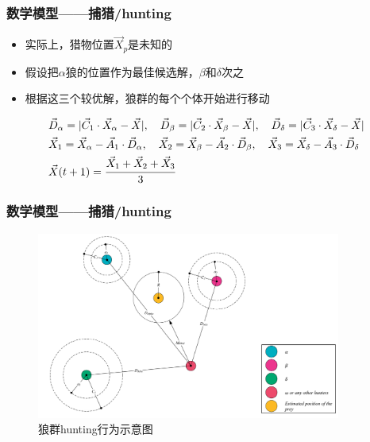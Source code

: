 \begin{frame}
	\frametitle{数学模型——捕猎/hunting}
	\begin{itemize}
		\item {实际上，猎物位置$\vec{X}_p$是未知的}
		\item {假设把$\alpha$狼的位置作为最佳候选解，$\beta$和$\delta$次之}
		\item {根据这三个较优解，狼群的每个个体开始进行移动}
	\end{itemize}
	\begin{align}
	&\vec{D}_{\alpha}=|\vec{C}_1 \cdot \vec{X}_{\alpha}-\vec{X}|,\quad \vec{D}_{\beta}=|\vec{C}_2 \cdot \vec{X}_{\beta}-\vec{X}|,\quad \vec{D}_{\delta}=|\vec{C}_3 \cdot \vec{X}_{\delta}-\vec{X}| \\
	&\vec{X}_1=\vec{X}_{\alpha}-\vec{A}_1 \cdot \vec{D}_{\alpha},\quad \vec{X}_2=\vec{X}_{\beta}-\vec{A}_2 \cdot \vec{D}_{\beta},\quad \vec{X}_3=\vec{X}_{\delta}-\vec{A}_3 \cdot \vec{D}_{\delta} \\
	&\vec{X}(t+1)=\cfrac{\vec{X}_1+\vec{X}_2+\vec{X}_3}{3}
	\end{align}
\end{frame}

\begin{frame}
	\frametitle{数学模型——捕猎/hunting}
	\begin{figure}[htbp]
		\centering
		\includegraphics[width=10cm]{pic/wolf4.png}
		\caption{狼群hunting行为示意图}
	\end{figure}
\end{frame}

